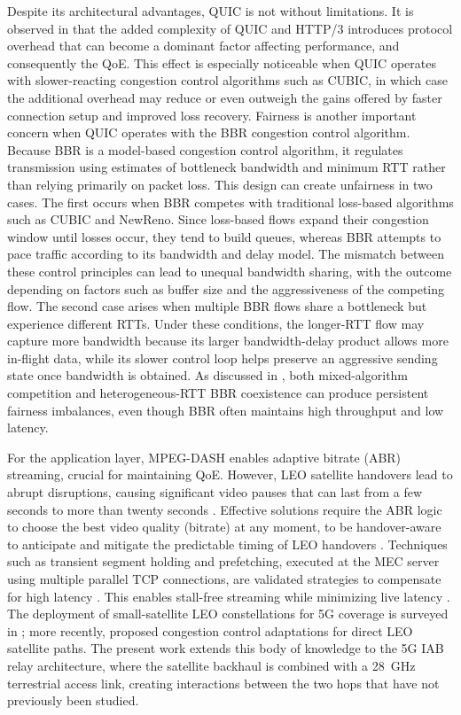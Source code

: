 \documentclass[journal]{IEEEtran}
\begin{document}
Despite its architectural advantages, QUIC is not without limitations. It is observed in \cite{Alshagri2023} that the added complexity of QUIC and HTTP/3 introduces protocol overhead that can become a dominant factor affecting performance, and consequently the QoE. This effect is especially noticeable when QUIC operates with slower-reacting congestion control algorithms such as CUBIC, in which case the additional overhead may reduce or even outweigh the gains offered by faster connection setup and improved loss recovery. Fairness is another important concern when QUIC operates with the BBR congestion control algorithm. Because BBR is a model-based congestion control algorithm, it regulates transmission using estimates of bottleneck bandwidth and minimum RTT rather than relying primarily on packet loss. This design can create unfairness in two cases. The first occurs when BBR competes with traditional loss-based algorithms such as CUBIC and NewReno. Since loss-based flows expand their congestion window until losses occur, they tend to build queues, whereas BBR attempts to pace traffic according to its bandwidth and delay model. The mismatch between these control principles can lead to unequal bandwidth sharing, with the outcome depending on factors such as buffer size and the aggressiveness of the competing flow. The second case arises when multiple BBR flows share a bottleneck but experience different RTTs. Under these conditions, the longer-RTT flow may capture more bandwidth because its larger bandwidth-delay product allows more in-flight data, while its slower control loop helps preserve an aggressive sending state once bandwidth is obtained. As discussed in \cite{Yue2025, Tang2024}, both mixed-algorithm competition and heterogeneous-RTT BBR coexistence can produce persistent fairness imbalances, even though BBR often maintains high throughput and low latency.

For the application layer, MPEG-DASH enables adaptive bitrate (ABR) streaming, crucial for maintaining QoE. However, LEO satellite handovers lead to abrupt disruptions, causing significant video pauses that can last from a few seconds to more than twenty seconds \cite{Fang2024}. Effective solutions require the ABR logic to choose the best video quality (bitrate) at any moment, to be handover-aware to anticipate and mitigate the predictable timing of LEO handovers \cite{Zhao2024, Fang2024}. Techniques such as transient segment holding and prefetching, executed at the MEC server using multiple parallel TCP connections, are validated strategies to compensate for high latency \cite{Ge2019}. This enables stall-free streaming while minimizing live latency \cite{Ge2019, Zhao2024}. The deployment of small-satellite LEO constellations for 5G coverage is surveyed in \cite{Leyva2020,Rinaldi2020}; more recently, \cite{Lai2025} proposed congestion control adaptations for direct LEO satellite paths. The present work extends this body of knowledge to the 5G IAB relay architecture, where the satellite backhaul is combined with a 28~GHz terrestrial access link, creating interactions between the two hops that have not previously been studied.
\end{document}
